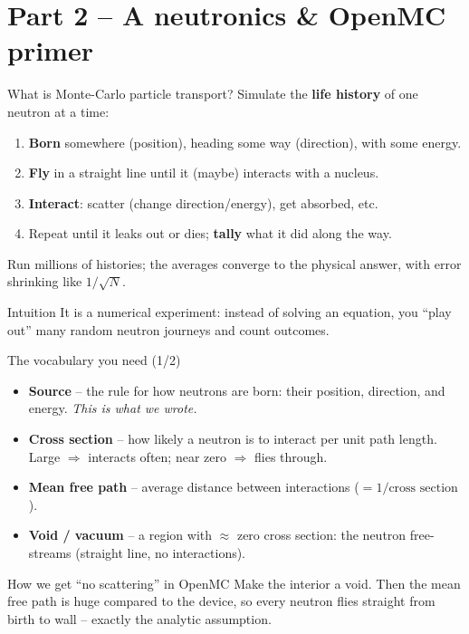 \documentclass[aspectratio=169]{beamer}
\newcommand{\keyword}[1]{\textcolor{blue!60!black}{\textbf{#1}}}
\begin{document}
\section{Part 2 -- A neutronics \& OpenMC primer}
\begin{frame}{What is Monte-Carlo particle transport?}
  Simulate the \keyword{life history} of one neutron at a time:
  \begin{enumerate}
    \item \keyword{Born} somewhere (position), heading some way (direction), with some energy.
    \item \keyword{Fly} in a straight line until it (maybe) interacts with a nucleus.
    \item \keyword{Interact}: scatter (change direction/energy), get absorbed, etc.
    \item Repeat until it leaks out or dies; \keyword{tally} what it did along the way.
  \end{enumerate}
  \vfill
  Run \alert{millions} of histories; the averages converge to the physical answer, with error shrinking like $1/\sqrt{N}$.
  \vfill
  \begin{block}{Intuition}
    It is a numerical experiment: instead of solving an equation, you ``play out'' many random neutron journeys and count outcomes.
  \end{block}
\end{frame}

\begin{frame}{The vocabulary you need (1/2)}
  \begin{itemize}
    \item \keyword{Source} -- the rule for how neutrons are \alert{born}: their position, \alert{direction}, and energy. \emph{This is what we wrote.}
    \item \keyword{Cross section} -- how likely a neutron is to interact per unit path length. Large $\Rightarrow$ interacts often; near zero $\Rightarrow$ flies through.
    \item \keyword{Mean free path} -- average distance between interactions ($= 1/\text{cross section}$).
    \item \keyword{Void / vacuum} -- a region with $\approx$ zero cross section: the neutron \alert{free-streams} (straight line, no interactions).
  \end{itemize}
  \vfill
  \begin{block}{How we get ``no scattering'' in OpenMC}
    Make the interior a \alert{void}. Then the mean free path is huge compared to the device, so every neutron flies straight from birth to wall -- exactly the analytic assumption.
  \end{block}
\end{frame}
\end{document}
